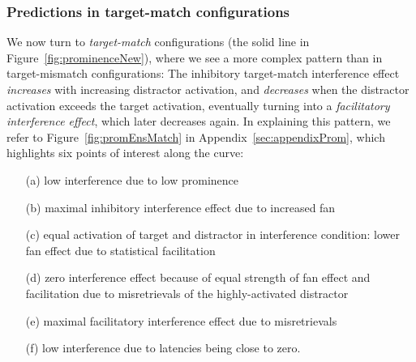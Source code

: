 \documentclass{cambridge7A}\usepackage[]{graphicx}\usepackage[]{color}
\newcommand{\revFE}[1]{#1}
\begin{document}
\revFE{
\subsubsection{Predictions in target-match configurations}
We now turn to \emph{target-match} configurations (the solid line in Figure~\ref{fig:prominenceNew}), where we see a more complex pattern than in target-mismatch configurations:
The inhibitory target-match interference effect \emph{increases} with increasing distractor activation, and \emph{decreases} when the distractor activation exceeds the target activation, eventually turning into a \emph{facilitatory interference effect}, which later decreases again.
In explaining this pattern, we refer to Figure~\ref{fig:promEnsMatch} in Appendix~\ref{sec:appendixProm}, which highlights six points of interest along the curve:

\begin{enumerate}
 		\item[(a)] low interference due to low prominence
 		\item[(b)] maximal inhibitory interference effect due to increased fan
 		\item[(c)] equal activation of target and distractor in interference condition: lower fan effect due to statistical facilitation
 		\item[(d)] zero interference effect because of equal strength of fan effect and facilitation due to misretrievals of the highly-activated distractor
 		\item[(e)] maximal facilitatory interference effect due to misretrievals
 		\item[(f)] low interference due to latencies being close to zero.
\end{enumerate}

}
\end{document}
